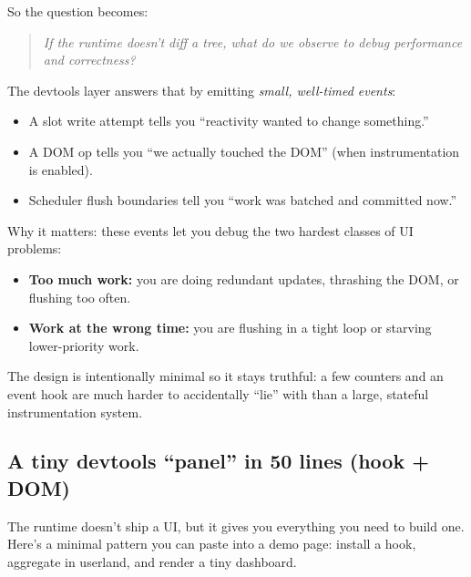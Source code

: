 So the question becomes:

\begin{quote}
\emph{If the runtime doesn't diff a tree, what do we observe to debug performance and correctness?}
\end{quote}

The devtools layer answers that by emitting \emph{small, well-timed events}:

\begin{itemize}
\item A slot write attempt tells you ``reactivity wanted to change something.''
\item A DOM op tells you ``we actually touched the DOM'' (when instrumentation is enabled).
\item Scheduler flush boundaries tell you ``work was batched and committed now.''
\end{itemize}

Why it matters: these events let you debug the two hardest classes of UI problems:

\begin{itemize}
\item \textbf{Too much work:} you are doing redundant updates, thrashing the DOM, or flushing too often.
\item \textbf{Work at the wrong time:} you are flushing in a tight loop or starving lower-priority work.
\end{itemize}

The design is intentionally minimal so it stays truthful: a few counters and an event hook are much harder to accidentally ``lie'' with than a large, stateful instrumentation system.

\subsection{A tiny devtools ``panel'' in 50 lines (hook + DOM)}

The runtime doesn't ship a UI, but it gives you everything you need to build one.
Here's a minimal pattern you can paste into a demo page: install a hook, aggregate in userland, and render a tiny dashboard.

